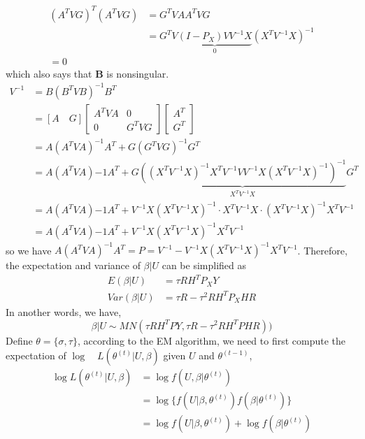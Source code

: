 \documentclass[12pt]{article}
\begin{document}
    \begin{align*}
        (A^TVG)^T(A^TVG)&=G^TVAA^TVG\\
        &=G^TV\underbrace{(I-P_X)VV^{-1}X}_{0}(X^TV^{-1}X)^{-1}\\
        =0
    \end{align*}
    which also says that \textbf{B} is nonsingular.
    \begin{align*}
        V^{-1}&=B(B^TVB)^{-1}B^T\\
        &=[A\quad G]\begin{bmatrix}
    A^TVA&0\\
    0&G^TVG
    \end{bmatrix}\begin{bmatrix}
    A^T\\
    G^T
    \end{bmatrix}\\
    &=A(A^TVA)^{-1}A^T+G(G^TVG)^{-1}G^T\\
    &=A(A^TVA){-1}A^T+G\underbrace{((X^TV^{-1}X)^{-1}X^TV^{-1}VV^{-1}X(X^TV^{-1}X)^{-1})^{-1}}_{X^TV^{-1}X}G^T\\
    &=A(A^TVA){-1}A^T+V^{-1}X(X^TV^{-1}X)^{-1}\cdot X^TV^{-1}X\cdot (X^TV^{-1}X)^{-1}X^TV^{-1}\\
    &=A(A^TVA){-1}A^T+V^{-1}X(X^TV^{-1}X)^{-1}X^TV^{-1}
    \end{align*}
    so we have $A(A^TVA)^{-1}A^T=P=V^{-1}-V^{-1}X(X^TV^{-1}X)^{-1}X^TV^{-1}$.
    Therefore, the expectation and variance of $\beta|U$ can be simplified as
    \begin{align*}
        E(\beta|U)&=\tau RH^TP_XY\\
        Var(\beta|U)&=\tau R-\tau^2 RH^TP_XHR
    \end{align*}
    In another words, we have,
    \begin{equation*}
    \beta|U\sim MN(\tau RH^TPY,\tau R-\tau^2 RH^TPHR))
    \end{equation*}
    Define $\theta=\{\sigma, \tau\}$, according to the EM algorithm, we need to first compute the expectation of $\log\quad L(\theta^{(t)}|U,\beta)$ given $U$ and $\theta^{(t-1)}$,
    \begin{equation*}
    \begin{split}
    \log L(\theta^{(t)}|U,\beta)&=\log f(U,\beta|\theta^{(t)})\\
    &=\log\{f(U|\beta,\theta^{(t)})f(\beta|\theta^{(t)})\}\\
    &=\log f(U|\beta,\theta^{(t)})+ \log f(\beta|\theta^{(t)})
    \end{split}
    \end{equation*}
\end{document}

